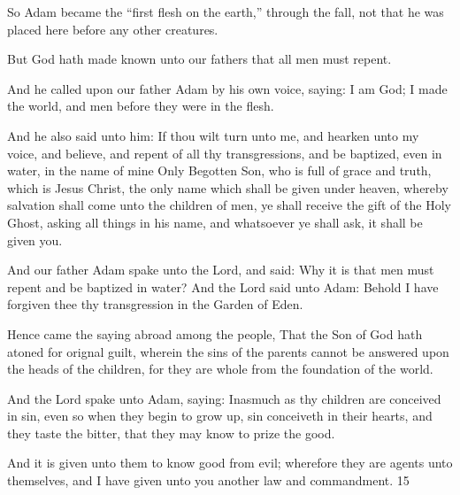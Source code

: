 So Adam became the ``first flesh on the earth,'' through the fall, not that he was placed here
before any other creatures.

But God hath made known unto our fathers that all men must repent.

And he called upon our father Adam by his own voice, saying: I am God; I made the world,
and men before they were in the flesh.

And he also said unto him: If thou wilt turn unto me, and hearken unto my voice, and
believe, and repent of all thy transgressions, and be baptized, even in water, in the name of
mine Only Begotten Son, who is full of grace and truth, which is Jesus Christ, the only name
which shall be given under heaven, whereby salvation shall come unto the children of men,
ye shall receive the gift of the Holy Ghost, asking all things in his name, and whatsoever ye
shall ask, it shall be given you.

And our father Adam spake unto the Lord, and said: Why it is that men must repent and be
baptized in water? And the Lord said unto Adam: Behold I have forgiven thee thy
transgression in the Garden of Eden.

Hence came the saying abroad among the people, That the Son of God hath atoned for
orignal guilt, wherein the sins of the parents cannot be answered upon the heads of the
children, for they are whole from the foundation of the world.

And the Lord spake unto Adam, saying: Inasmuch as thy children are conceived in sin, even
so when they begin to grow up, sin conceiveth in their hearts, and they taste the bitter, that
they may know to prize the good.

And it is given unto them to know good from evil; wherefore they are agents unto
themselves, and I have given unto you another law and commandment. 15

